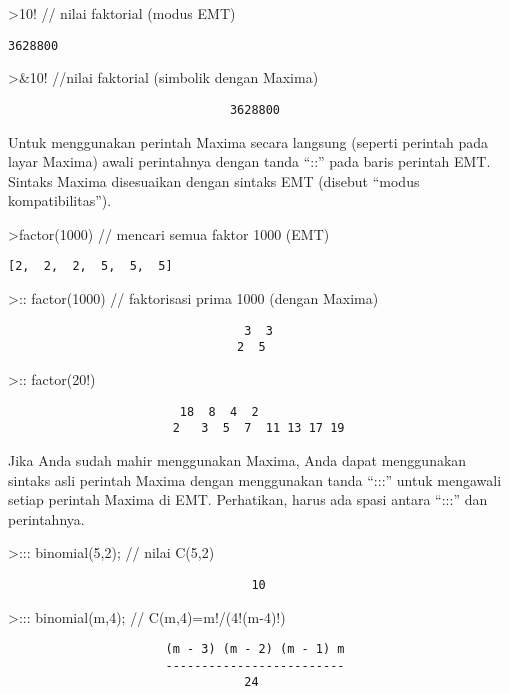 \documentclass[
]{book}
\begin{document}
\textgreater10! // nilai faktorial (modus EMT)

\begin{verbatim}
3628800
\end{verbatim}

\textgreater\&10! //nilai faktorial (simbolik dengan Maxima)

\begin{verbatim}
                               3628800
\end{verbatim}

Untuk menggunakan perintah Maxima secara langsung (seperti perintah pada layar Maxima) awali perintahnya dengan tanda ``::'' pada baris perintah EMT. Sintaks Maxima disesuaikan dengan sintaks EMT (disebut ``modus kompatibilitas'').

\textgreater factor(1000) // mencari semua faktor 1000 (EMT)

\begin{verbatim}
[2,  2,  2,  5,  5,  5]
\end{verbatim}

\textgreater:: factor(1000) // faktorisasi prima 1000 (dengan Maxima)

\begin{verbatim}
                                 3  3
                                2  5
\end{verbatim}

\textgreater:: factor(20!)

\begin{verbatim}
                        18  8  4  2
                       2   3  5  7  11 13 17 19
\end{verbatim}

Jika Anda sudah mahir menggunakan Maxima, Anda dapat menggunakan sintaks asli perintah Maxima dengan menggunakan tanda ``:::'' untuk mengawali setiap perintah Maxima di EMT. Perhatikan, harus ada spasi antara ``:::'' dan perintahnya.

\textgreater::: binomial(5,2); // nilai C(5,2)

\begin{verbatim}
                                  10
\end{verbatim}

\textgreater::: binomial(m,4); // C(m,4)=m!/(4!(m-4)!)

\begin{verbatim}
                      (m - 3) (m - 2) (m - 1) m
                      -------------------------
                                 24
\end{verbatim}
\end{document}
